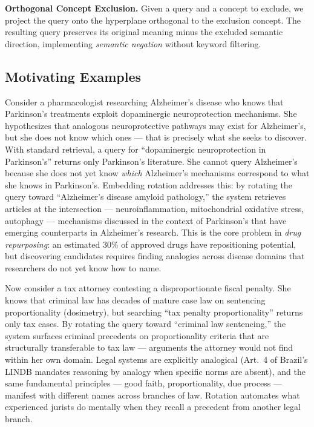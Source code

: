 \documentclass{article}
\begin{document}
\textbf{Orthogonal Concept Exclusion.} Given a query and a concept to exclude, we project the query onto the hyperplane orthogonal to the exclusion concept. The resulting query preserves its original meaning minus the excluded semantic direction, implementing \emph{semantic negation} without keyword filtering.

\subsection{Motivating Examples}

Consider a pharmacologist researching Alzheimer's disease who knows that Parkinson's treatments exploit dopaminergic neuroprotection mechanisms. She hypothesizes that analogous neuroprotective pathways may exist for Alzheimer's, but she does not know which ones --- that is precisely what she seeks to discover. With standard retrieval, a query for ``dopaminergic neuroprotection in Parkinson's'' returns only Parkinson's literature. She cannot query Alzheimer's because she does not yet know \emph{which} Alzheimer's mechanisms correspond to what she knows in Parkinson's. Embedding rotation addresses this: by rotating the query toward ``Alzheimer's disease amyloid pathology,'' the system retrieves articles at the intersection --- neuroinflammation, mitochondrial oxidative stress, autophagy --- mechanisms discussed in the context of Parkinson's that have emerging counterparts in Alzheimer's research. This is the core problem in \emph{drug repurposing}: an estimated 30\% of approved drugs have repositioning potential, but discovering candidates requires finding analogies across disease domains that researchers do not yet know how to name.

Now consider a tax attorney contesting a disproportionate fiscal penalty. She knows that criminal law has decades of mature case law on sentencing proportionality (dosimetry), but searching ``tax penalty proportionality'' returns only tax cases. By rotating the query toward ``criminal law sentencing,'' the system surfaces criminal precedents on proportionality criteria that are structurally transferable to tax law --- arguments the attorney would not find within her own domain. Legal systems are explicitly analogical (Art.~4 of Brazil's LINDB mandates reasoning by analogy when specific norms are absent), and the same fundamental principles --- good faith, proportionality, due process --- manifest with different names across branches of law. Rotation automates what experienced jurists do mentally when they recall a precedent from another legal branch.
\end{document}
